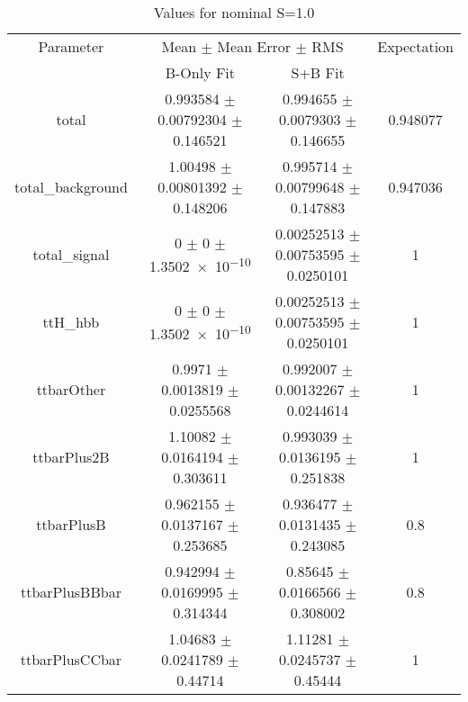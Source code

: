 \begin{table}
\centering
\caption{Values for nominal S=1.0}
\begin{tabular}{cccc}
\toprule
Parameter & \multicolumn{2}{c}{Mean $\pm$ Mean Error $\pm$ RMS} & Expectation\\
 & B-Only Fit & S+B Fit & \\
\midrule
total & \num{0.993584} $\pm$ \num{0.00792304} $\pm$ \num{0.146521} & \num{0.994655} $\pm$ \num{0.0079303} $\pm$ \num{0.146655} & \num{0.948077}\\
total\_background & \num{1.00498} $\pm$ \num{0.00801392} $\pm$ \num{0.148206} & \num{0.995714} $\pm$ \num{0.00799648} $\pm$ \num{0.147883} & \num{0.947036}\\
total\_signal & \num{0} $\pm$ \num{0} $\pm$ \num{1.3502e-10} & \num{0.00252513} $\pm$ \num{0.00753595} $\pm$ \num{0.0250101} & \num{1}\\
ttH\_hbb & \num{0} $\pm$ \num{0} $\pm$ \num{1.3502e-10} & \num{0.00252513} $\pm$ \num{0.00753595} $\pm$ \num{0.0250101} & \num{1}\\
ttbarOther & \num{0.9971} $\pm$ \num{0.0013819} $\pm$ \num{0.0255568} & \num{0.992007} $\pm$ \num{0.00132267} $\pm$ \num{0.0244614} & \num{1}\\
ttbarPlus2B & \num{1.10082} $\pm$ \num{0.0164194} $\pm$ \num{0.303611} & \num{0.993039} $\pm$ \num{0.0136195} $\pm$ \num{0.251838} & \num{1}\\
ttbarPlusB & \num{0.962155} $\pm$ \num{0.0137167} $\pm$ \num{0.253685} & \num{0.936477} $\pm$ \num{0.0131435} $\pm$ \num{0.243085} & \num{0.8}\\
ttbarPlusBBbar & \num{0.942994} $\pm$ \num{0.0169995} $\pm$ \num{0.314344} & \num{0.85645} $\pm$ \num{0.0166566} $\pm$ \num{0.308002} & \num{0.8}\\
ttbarPlusCCbar & \num{1.04683} $\pm$ \num{0.0241789} $\pm$ \num{0.44714} & \num{1.11281} $\pm$ \num{0.0245737} $\pm$ \num{0.45444} & \num{1}\\
\bottomrule
\end{tabular}
\end{table}